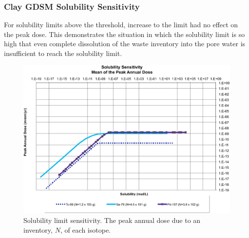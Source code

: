 \begin{frame}[ctb!]
\frametitle{Clay GDSM Solubility Sensitivity}
For solubility limits above the threshold, increase to the limit had no effect on the peak dose. This demonstrates the 
situation in which the solubility limit is so high that even complete 
dissolution of the waste inventory into the pore water is insufficient to reach 
the solubility limit.
\begin{figure}[htb!]
\centering
\includegraphics[width=0.7\linewidth]{./nuclide_demonstration/Solubility_Summary_Sol.eps}
\caption{Solubility limit sensitivity. The peak annual dose due to an inventory, 
$N$, of each isotope.}
\label{fig:SolSum}
\end{figure}
\end{frame}
